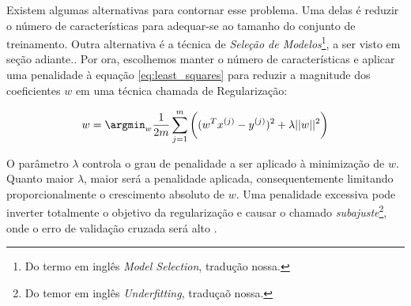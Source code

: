 

Existem algumas alternativas para contornar esse problema. Uma delas é reduzir o número de características para adequar-se ao tamanho do conjunto de treinamento. Outra alternativa é a técnica de \textit{Seleção de Modelos}\footnote{Do termo em inglês \textit{Model Selection}, tradução nossa.}, a ser visto em seção adiante.. Por ora, escolhemos manter o número de características e aplicar uma penalidade à equação \ref{eq:least_squares} para reduzir a magnitude dos coeficientes $ w $ \cite{Bishop} em uma técnica chamada de Regularização\cite[p.10,p.68]{Bishop,Hastie}:

\begin{equation}
w = \argmin_w \dfrac{1}{2m} \sum_{j=1}^{m} \bigg((w^{T} x^{(j)} - y^{(j)})^2 + \lambda||w||^2\bigg)
\end{equation}

O parâmetro $ \lambda $ controla o grau de penalidade a ser aplicado à minimização de $ w $. Quanto maior $ \lambda $, maior será a penalidade aplicada, consequentemente limitando proporcionalmente o crescimento absoluto de $ w $. Uma penalidade excessiva pode inverter totalmente o objetivo da regularização e causar o chamado \textit{subajuste}\footnote{Do temor em inglês \textit{Underfitting}, traduçaõ nossa.}, onde o erro de validação cruzada será alto \cite{Andrew}. 

